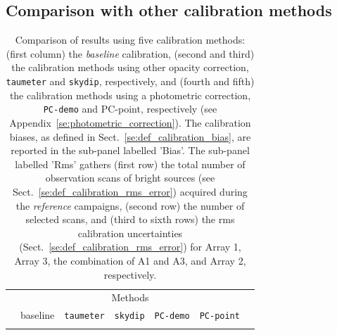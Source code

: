 %
%
\subsection{Comparison with other calibration methods}
\label{se:photometry_others}
\begin{table}[!htbp]
\begin{center}
\caption[Comparison of calibration results using five
  methods]{Comparison of results using five calibration
  methods: (first column) the \emph{baseline} calibration, (second and
  third) the calibration methods using other opacity correction, {\tt
  taumeter} and {\tt skydip}, respectively, and
  (fourth and fifth) the calibration methods using a photometric correction, {\tt
  PC-demo} and {PC-point}, respectively (see Appendix~\ref{se:photometric_correction}).  
  The calibration biases, as defined in
  Sect.~\ref{se:def_calibration_bias}, are reported in the sub-panel
  labelled 'Bias'. The sub-panel labelled 'Rms' gathers (first row) the total number of
  observation scans of bright sources (see
  Sect.~\ref{se:def_calibration_rms_error}) acquired during
  the \emph{reference} campaigns, (second row) the number of selected
  scans, and (third to sixth rows) the rms calibration uncertainties
  (Sect.~\ref{se:def_calibration_rms_error}) for Array 1, Array 3, the
  combination of A1 and A3, and Array 2, respectively. }
\label{tab:Calibration_results_all}
\begin{tabular}{clrrrrr}
  \hline\hline
  \noalign{\smallskip}
  \multicolumn{2}{c}{}  &  \multicolumn{5}{c}{Methods} \\\cline{3-7}
  \noalign{\smallskip}
  \multicolumn{2}{c}{Characteristics} &  baseline  & {\small {\tt taumeter}}  & {\small {\tt skydip}}  &  {\small {\tt PC-demo}} & {\small {\tt PC-point}} \\
  \hline
  \noalign{\smallskip}

\end{tabular}
\end{center}
\end{table}
